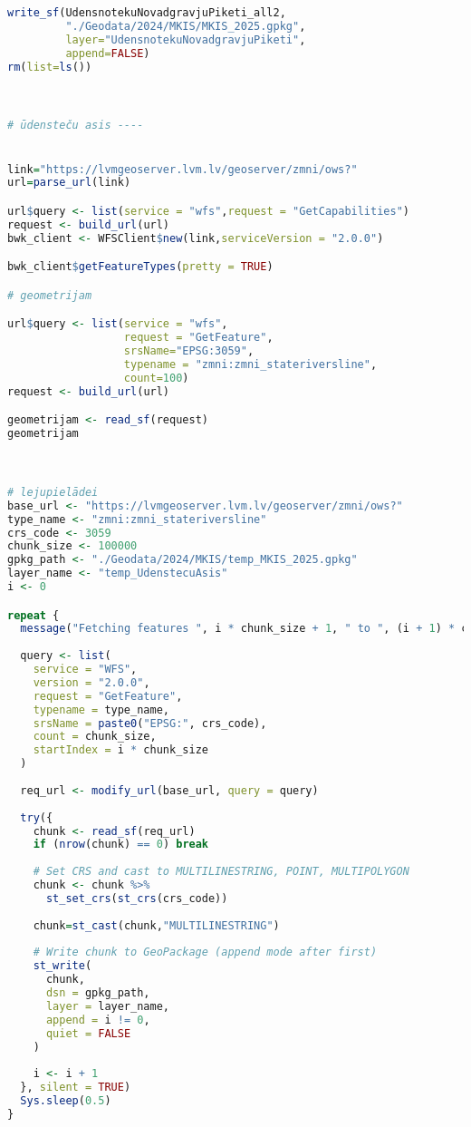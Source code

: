 \documentclass[
]{book}
\begin{document}
\begin{lstlisting}[language=R]
write_sf(UdensnotekuNovadgravjuPiketi_all2,
         "./Geodata/2024/MKIS/MKIS_2025.gpkg",
         layer="UdensnotekuNovadgravjuPiketi",
         append=FALSE)
rm(list=ls())



# ūdensteču asis ----


link="https://lvmgeoserver.lvm.lv/geoserver/zmni/ows?"
url=parse_url(link)

url$query <- list(service = "wfs",request = "GetCapabilities")
request <- build_url(url)
bwk_client <- WFSClient$new(link,serviceVersion = "2.0.0")

bwk_client$getFeatureTypes(pretty = TRUE)

# geometrijam

url$query <- list(service = "wfs",
                  request = "GetFeature",
                  srsName="EPSG:3059",
                  typename = "zmni:zmni_stateriversline",
                  count=100)
request <- build_url(url)

geometrijam <- read_sf(request)
geometrijam



# lejupielādei
base_url <- "https://lvmgeoserver.lvm.lv/geoserver/zmni/ows?"
type_name <- "zmni:zmni_stateriversline"
crs_code <- 3059
chunk_size <- 100000
gpkg_path <- "./Geodata/2024/MKIS/temp_MKIS_2025.gpkg"
layer_name <- "temp_UdenstecuAsis"
i <- 0

repeat {
  message("Fetching features ", i * chunk_size + 1, " to ", (i + 1) * chunk_size, "...")
  
  query <- list(
    service = "WFS",
    version = "2.0.0",
    request = "GetFeature",
    typename = type_name,
    srsName = paste0("EPSG:", crs_code),
    count = chunk_size,
    startIndex = i * chunk_size
  )
  
  req_url <- modify_url(base_url, query = query)
  
  try({
    chunk <- read_sf(req_url)
    if (nrow(chunk) == 0) break
    
    # Set CRS and cast to MULTILINESTRING, POINT, MULTIPOLYGON
    chunk <- chunk %>%
      st_set_crs(st_crs(crs_code))
    
    chunk=st_cast(chunk,"MULTILINESTRING")
    
    # Write chunk to GeoPackage (append mode after first)
    st_write(
      chunk, 
      dsn = gpkg_path,
      layer = layer_name,
      append = i != 0,
      quiet = FALSE
    )
    
    i <- i + 1
  }, silent = TRUE)
  Sys.sleep(0.5)
}


\end{lstlisting}
\end{document}
